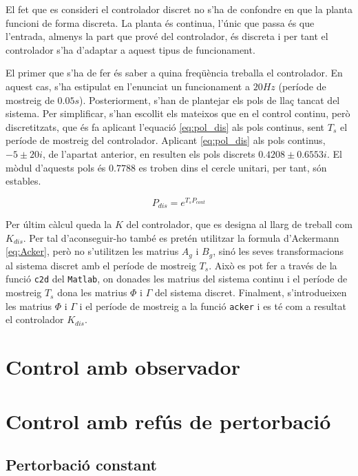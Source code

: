 \documentclass[12pt,a4paper,final,twoside,openright]{report}
\begin{document}
El fet que es consideri el controlador discret no s'ha de confondre en que la planta funcioni de forma discreta. La planta és continua, l'únic que passa és que l'entrada, almenys la part que prové del controlador, és discreta i per tant el controlador s'ha d'adaptar a aquest tipus de funcionament. 

El primer que s'ha de fer és saber a quina freqüència treballa el controlador. En aquest cas, s'ha estipulat en l'enunciat un funcionament a $20 Hz$ (període de mostreig de $0.05 s$). Posteriorment, s'han de plantejar els pols de llaç tancat del sistema. Per simplificar, s'han escollit els mateixos que en el control continu, però discretitzats, que és fa aplicant l'equació \eqref{eq:pol_dis} als pols continus, sent $T_s$ el període de mostreig del controlador. Aplicant \eqref{eq:pol_dis} als pols continus, $-5\pm20i$, de l'apartat anterior, en resulten els pols discrets $0.4208\pm0.6553i$. El mòdul d'aquests pols és $0.7788$ es troben dins el cercle unitari, per tant, són estables. 

\begin{equation}\label{eq:pol_dis}
P_{dis} = e^{T_s P_{cont}}
\end{equation}


Per últim càlcul queda la $K$ del controlador, que es designa al llarg de treball com $K_{dis}$. Per tal d'aconseguir-ho també es pretén utilitzar la formula d'Ackermann \eqref{eq:Acker}, però no s'utilitzen les matrius $A_g$ i $B_g$, sinó les seves transformacions al sistema discret amb el període de mostreig $T_s$. Això es pot fer a través de la funció \texttt{c2d} del \texttt{Matlab}, on donades les matrius del sistema continu i el període de mostreig $T_s$ dona les matrius $\Phi$ i $\Gamma$ del sistema discret. Finalment, s'introdueixen les matrius $\Phi$ i $\Gamma$ i el període de mostreig a la funció \texttt{acker} i es té com a resultat el controlador $K_{dis}$.

\section{Control amb observador}

\section{Control amb refús de pertorbació}

\subsection{Pertorbació constant}
\end{document}

